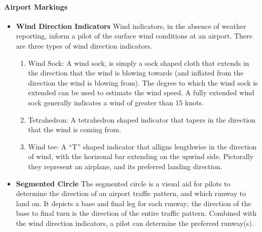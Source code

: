 \documentclass[12pt]{article}
\begin{document}
			\paragraph{Airport Markings}
			\begin{itemize}
				\item\textbf{Wind Direction Indicators} Wind indicators, in the absence of weather reporting, inform a pilot of the surface wind conditions at an airport. There are three types of wind direction indicators.
				\begin{enumerate}
					\item Wind Sock: A wind sock, is simply a sock shaped cloth that extends in the direction that the wind is blowing towards (and inflated from the direction the wind is blowing from). The degree to which the wind sock is extended can be used to estimate the wind speed. A fully extended wind sock generally indicates a wind of greater than 15 knots. 
					\item Tetrahedron: A tetrahedron shaped indicator that tapers in the direction that the wind is coming from.
					\item Wind tee: A ``T'' shaped indicator that alligns lengthwise in the direction of wind, with the horizonal bar extending on the upwind side. Pictorally they represent an airplane, and its preferred landing direction.
				\end{enumerate}
				\item\textbf{Segmented Circle} The segmented circle is a visual aid for pilots to determine the direction of an airport traffic pattern, and which runway to land on. It depicts a base and final leg for each runway; the direction of the base to final turn is the direction of the entire traffic pattern. Combined with the wind direction indicators, a pilot can determine the preferred runway(s).
					\begin{figure}[H]
			    		\centering

\end{figure}
\end{itemize}
\end{document}

